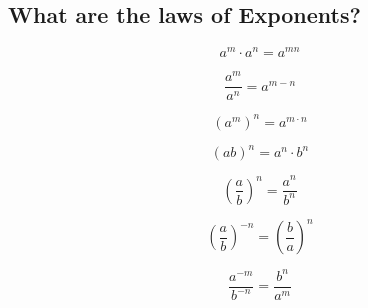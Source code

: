 \subsection{What are the laws of Exponents?}

$$
a^{m} \cdot a^{n} = a^{mn}
$$

$$
\frac{a^{m}}{a^{n}} = a^{m-n}
$$

$$
\left( a^{m} \right)^{n} = a^{m \cdot n}
$$

$$
\left( ab \right)^{n} = a^{n} \cdot b^{n}
$$

$$
\left( \frac{a}{b} \right) ^{n} = \frac{a^{n}}{b^{n}}
$$

$$
\left( \frac{a}{b} \right)^{-n} = \left( \frac{b}{a} \right)^{n}
$$

$$
\frac{a^{-m}}{b^{-n}} = \frac{b^{n}}{a^{m}}
$$

